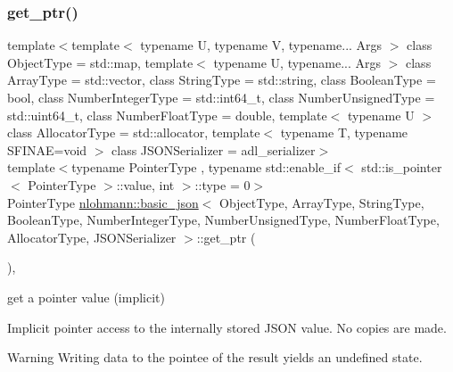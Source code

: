 \subsubsection{\texorpdfstring{get\+\_\+ptr()}{get\_ptr()}\hspace{0.1cm}{\footnotesize\ttfamily [1/2]}}
{\footnotesize\ttfamily template$<$template$<$ typename U, typename V, typename... Args $>$ class Object\+Type = std\+::map, template$<$ typename U, typename... Args $>$ class Array\+Type = std\+::vector, class String\+Type  = std\+::string, class Boolean\+Type  = bool, class Number\+Integer\+Type  = std\+::int64\+\_\+t, class Number\+Unsigned\+Type  = std\+::uint64\+\_\+t, class Number\+Float\+Type  = double, template$<$ typename U $>$ class Allocator\+Type = std\+::allocator, template$<$ typename T, typename S\+F\+I\+N\+A\+E=void $>$ class J\+S\+O\+N\+Serializer = adl\+\_\+serializer$>$ \\
template$<$typename Pointer\+Type , typename std\+::enable\+\_\+if$<$ std\+::is\+\_\+pointer$<$ Pointer\+Type $>$\+::value, int $>$\+::type  = 0$>$ \\
Pointer\+Type \mbox{\hyperlink{classnlohmann_1_1basic__json}{nlohmann\+::basic\+\_\+json}}$<$ Object\+Type, Array\+Type, String\+Type, Boolean\+Type, Number\+Integer\+Type, Number\+Unsigned\+Type, Number\+Float\+Type, Allocator\+Type, J\+S\+O\+N\+Serializer $>$\+::get\+\_\+ptr (\begin{DoxyParamCaption}{ }\end{DoxyParamCaption})\hspace{0.3cm}{\ttfamily [inline]}, {\ttfamily [noexcept]}}



get a pointer value (implicit) 

Implicit pointer access to the internally stored J\+S\+ON value. No copies are made.

\begin{DoxyWarning}{Warning}
Writing data to the pointee of the result yields an undefined state.
\end{DoxyWarning}

